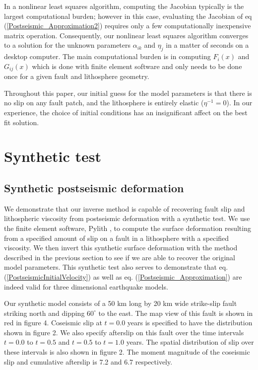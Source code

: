 \documentclass[12pt]{article}
\begin{document}
In a nonlinear least squares algorithm, computing the Jacobian
typically is the largest computational burden; however in this case,
evaluating the Jacobian of eq (\ref{Postseismic_Approximation2})
requires only a few computationally inexpensive matrix operation.
Consequently, our nonlinear least squares algorithm converges to a
solution for the unknown parameters $\alpha_{ik}$ and $\eta_j$ in a
matter of seconds on a desktop computer.  The main computational
burden is in computing $F_i(x)$ and $G_{ij}(x)$ which is done with
finite element software and only needs to be done once for a given
fault and lithosphere geometry.

Throughout this paper, our initial guess for the model parameters is
that there is no slip on any fault patch, and the lithosphere is
entirely elastic ($\eta^{-1} = 0$).  In our experience, the choice of
initial conditions has an insignificant affect on the best fit
solution.

\section{Synthetic test}
\subsection{Synthetic postseismic deformation}

We demonstrate that our inverse method is capable of recovering
fault slip and lithospheric viscosity from postseismic deformation
with a synthetic test.  We use the finite element software,
Pylith \citep{A2007}, to compute the surface deformation resulting from
a specified amount of slip on a fault in a lithosphere with a
specified viscosity.  We then invert this synthetic surface
deformation with the method described in the previous section to see
if we are able to recover the original model parameters.  This
synthetic test also serves to demonstrate that
eq. (\ref{PostseismicInitialVelocity}) as well as
eq. (\ref{Postseismic_Approximation}) are indeed valid for three
dimensional earthquake models.

Our synthetic model consists of a 50 km long by 20 km wide strike-slip
fault striking north and dipping $60^{\circ}$ to the east.  The map
view of this fault is shown in red in figure 4. Coseismic slip at
$t=0.0$ years is specified to have the distribution shown in figure 2.
We also specify afterslip on this fault over the time intervals
$t=0.0$ to $t=0.5$ and $t=0.5$ to $t=1.0$ years.  The spatial
distribution of slip over these intervals is also shown in figure 2.  The
moment magnitude of the coseismic slip and cumulative afterslip is 7.2
and 6.7 respectively.
\end{document}
